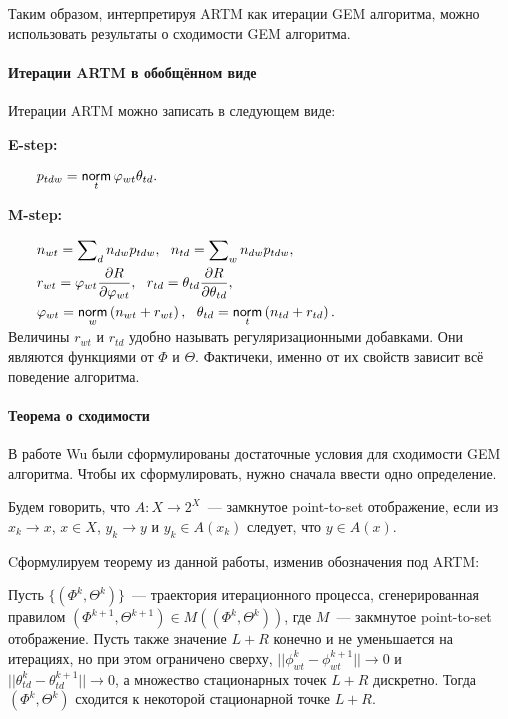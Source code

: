 \documentclass[12pt, twoside]{article}
\begin{document}
Таким образом, интерпретируя ARTM как итерации GEM алгоритма, можно использовать результаты о сходимости GEM алгоритма.

\paragraph{Итерации ARTM в обобщённом виде}	  
Итерации ARTM можно записать в следующем виде: 

\textbf{E-step:}   
 
$
\begin{aligned}
\qquad& p_{tdw} = \mathop{\mathsf{norm}}\limits_t \varphi_{wt} \theta_{td}.
\end{aligned}
$\medskip

\textbf{M-step:}

$
\begin{aligned}    
\qquad& n_{wt} = \sum\nolimits_{d} n_{dw} p_{tdw},~~n_{td} = \sum\nolimits_{w} n_{dw} p_{tdw},\\    
\qquad& r_{wt} =  \varphi_{wt}\frac{\partial R}{\partial\varphi_{wt}},~~ r_{td} =  \theta_{td}\frac{\partial R}{\partial\theta_{td}},\\
\qquad& \varphi_{wt}  = \mathop{\mathsf{norm}}\limits_w \left(n_{wt} + r_{wt} \right),~~\theta_{td} = \mathop{\mathsf{norm}}\limits_t  \left(n_{td} + r_{td}\right).\\
\end{aligned}
$\medskip\\
Величины $r_{wt}$ и $r_{td}$ удобно называть регуляризационными добавками. Они являются функциями от $\Phi$ и $\Theta$. Фактичеки, именно от их свойств зависит всё поведение алгоритма.


\paragraph{Теорема о сходимости}

 В работе Wu \cite{wu1983convergence} были сформулированы достаточные условия для сходимости GEM алгоритма. Чтобы их сформулировать, нужно сначала ввести одно определение.
\begin{Definition}
Будем говорить, что $A\colon X \to 2^X$~--- замкнутое point-to-set отображение, если из $x_k \to x$, $x \in X$, $y_k \to y$ и $y_k \in A(x_k)$ следует, что $y \in A(x)$.
\end{Definition}

Cформулируем теорему из данной работы, изменив обозначения под ARTM:
\begin{Theorem} \label{Theorem_wu} 
Пусть $\{(\Phi^k, \Theta^k)\}$~--- траектория итерационного процесса, сгенерированная правилом $(\Phi^{k+1}, \Theta^{k+1}) \in M((\Phi^k, \Theta^k))$, где $M$~--- закмнутое point-to-set отображение. Пусть также значение $L +  R$ конечно и не уменьшается на итерациях, но при этом ограничено сверху, $|| \phi^k_{wt} - \phi^{k+1}_{wt}|| \to 0$ и $|| \theta^k_{td} - \theta^{k+1}_{td}||\to 0$, а множество стационарных точек $L +  R$ дискретно. Тогда $(\Phi^k, \Theta^k)$ сходится к некоторой стационарной точке $L +  R$.
\end{Theorem}
\end{document}
